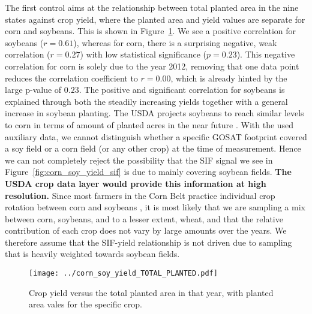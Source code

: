 \documentclass[preprint, a4paper, 10pt, times, 5p]{elsarticle}
\begin{document}
The first control aims at the relationship between total planted area in the nine states against crop yield, where the planted area and yield values are separate for corn and soybeans. This is shown in Figure~\ref{fig:corn_soy_yield_TOTAL_PLANTED}. We see a positive correlation for soybeans ($r = 0.61$), whereas for corn, there is a surprising negative, weak correlation  ($r = 0.27$) with low statistical significance ($p = 0.23$). This negative correlation for corn is solely due to the year 2012, removing that one data point reduces the correlation coefficient to $r = 0.00$, which is already hinted by the large p-value of $0.23$. The positive and significant correlation for soybeans is explained through both the steadily increasing yields together with a general increase in soybean planting. The USDA projects soybeans to reach similar levels to corn in terms of amount of planted acres in the near future \citep{USDA-prognosis}. With the used auxiliary data, we cannot distinguish whether a specific GOSAT footprint covered a soy field or a corn field (or any other crop) at the time of measurement. Hence we can not completely reject the possibility that the SIF signal we see in Figure~\ref{fig:corn_soy_yield_sif} is due to mainly covering soybean fields. \textbf{The USDA crop data layer would provide this information at high resolution.} Since most farmers in the Corn Belt practice individual crop rotation between corn and soybeans \citep{suyker2012gross}, it is most likely that we are sampling a mix between corn, soybeans, and to a lesser extent, wheat, and that the relative contribution of each crop does not vary by large amounts over the years. We therefore assume that the SIF-yield relationship is not driven due to sampling that is heavily weighted towards soybean fields.
 
\begin{figure}[htbp]
\centering
\texttt{[image: ../corn\_soy\_yield\_TOTAL\_PLANTED.pdf]}
\caption{Crop yield versus the total planted area in that year, with planted area vales for the specific crop.}
\label{fig:corn_soy_yield_TOTAL_PLANTED}
\end{figure}
\end{document}
